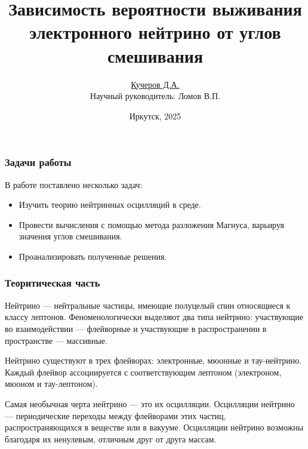 \documentclass[utf8,9pt,mathserif,usepdftitle=false]{beamer}
\title{Зависимость вероятности выживания электронного нейтрино от углов
  смешивания}%
\author{\underline{Кучеров Д.А.}\\[7em]\raggedleft\footnotesize Научный руководитель:
  Ломов В.П.\\%
}%
\date[ИГУ, 2025]{\vfill%
  \small{}Иркутск, 2025}
\begin{document}
\begin{frame}
  \titlepage
\end{frame}

\begin{frame}
	\frametitle{Задачи работы}
  В работе поставлено несколько задач:
  \begin{itemize}
  \item<2-> Изучить теорию нейтринных осцилляций в среде.
  \item<3-> Провести вычисления с помощью метода разложения Магнуса, варьируя значения углов смешивания.
  \item<4-> Проанализировать полученные решения.
  \end{itemize}
\end{frame}

\begin{frame}
	\frametitle{Теоритическая часть}%
	Нейтрино --- нейтральные частицы, имеющие полуцелый спин относящиеся к классу лептонов. Феноменологически выделяют два типа нейтрино: участвующие во взаимодействии --- флейворные и участвующие в распространении в пространстве --- массивные.

	Нейтрино существуют в трех флейворах: электронные, мюонные и
  тау-нейтрино. Каждый флейвор ассоциируется с соответствующим лептоном
  (электроном, мюоном и тау-лептоном).

 Самая необычная черта нейтрино — это их осцилляции. Осцилляции нейтрино — периодические переходы между флейворами этих частиц, распространяющихся в веществе или в вакууме. Осцилляции нейтрино возможны благодаря их ненулевым, отличным друг от друга массам.
\end{frame}
\end{document}
